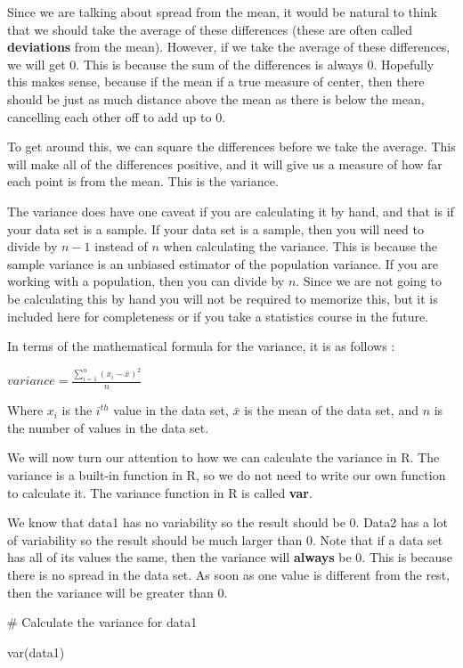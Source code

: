 \documentclass[
  letterpaper,
  DIV=11,
  numbers=noendperiod]{scrreprt}
\newenvironment{Shaded}{\begin{snugshade}}{\end{snugshade}}
\newcommand{\CommentTok}[1]{\textcolor[rgb]{0.37,0.37,0.37}{#1}}
\newcommand{\FunctionTok}[1]{\textcolor[rgb]{0.28,0.35,0.67}{#1}}
\newcommand{\NormalTok}[1]{\textcolor[rgb]{0.00,0.23,0.31}{#1}}
\begin{document}
Since we are talking about spread from the mean, it would be natural to
think that we should take the average of these differences (these are
often called \textbf{deviations} from the mean). However, if we take the
average of these differences, we will get 0. This is because the sum of
the differences is always 0. Hopefully this makes sense, because if the
mean if a true measure of center, then there should be just as much
distance above the mean as there is below the mean, cancelling each
other off to add up to 0.

To get around this, we can square the differences before we take the
average. This will make all of the differences positive, and it will
give us a measure of how far each point is from the mean. This is the
variance.

The variance does have one caveat if you are calculating it by hand, and
that is if your data set is a sample. If your data set is a sample, then
you will need to divide by \(n-1\) instead of \(n\) when calculating the
variance. This is because the sample variance is an unbiased estimator
of the population variance. If you are working with a population, then
you can divide by \(n\). Since we are not going to be calculating this
by hand you will not be required to memorize this, but it is included
here for completeness or if you take a statistics course in the future.

In terms of the mathematical formula for the variance, it is as follows
:

\(variance = \displaystyle{\frac{\sum_{i=1}^{n} (x_i - \bar{x})^2}{n}}\)

Where \(x_i\) is the \(i^{th}\) value in the data set, \(\bar{x}\) is
the mean of the data set, and \(n\) is the number of values in the data
set.

We will now turn our attention to how we can calculate the variance in
R. The variance is a built-in function in R, so we do not need to write
our own function to calculate it. The variance function in R is called
\textbf{var}.

We know that data1 has no variability so the result should be 0. Data2
has a lot of variability so the result should be much larger than 0.
Note that if a data set has all of its values the same, then the
variance will \textbf{always} be 0. This is because there is no spread
in the data set. As soon as one value is different from the rest, then
the variance will be greater than 0.

\begin{Shaded}
\begin{Highlighting}[]
\CommentTok{\# Calculate the variance for data1}

\FunctionTok{var}\NormalTok{(data1)}
\end{Highlighting}
\end{Shaded}
\end{document}
